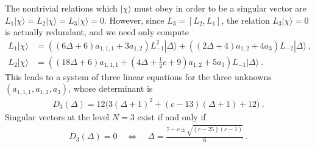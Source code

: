 \documentclass[12pt,a4paper,notitlepage]{report}
\numberwithin{equation}{section}
\theoremstyle{break}
\begin{document}
The nontrivial relations which $|\chi\rangle$ must obey in order to be a singular vector are $L_1|\chi\rangle =L_2|\chi\rangle= L_3 |\chi\rangle=0$. However, since $L_3 = [L_2,L_1]$, the relation $L_3|\chi\rangle=0$ is actually redundant, and we need only compute
\begin{align}
 L_1|\chi\rangle &= \left((6\Delta+6)a_{1,1,1}+3a_{1,2}\right)L_{-1}^2|\Delta\rangle +\left((2\Delta+4)a_{1,2}+4a_3\right)L_{-2}|\Delta\rangle\ ,
\\
L_2|\chi\rangle &= \left((18\Delta+6)a_{1,1,1}+(4\Delta+\tfrac12c +9)a_{1,2}+5a_3\right)L_{-1}|\Delta\rangle\ .
\end{align}
This leads to a system of three linear equations for the three unknowns $(a_{1,1,1},a_{1,2},a_3)$, whose determinant is
\begin{align}
 D_3(\Delta) = 12\Big(3(\Delta+1)^2+(c-13)(\Delta+1)+12\Big)\ .
\end{align}
Singular vectors at the level $N=3$ exist if and only if 
\begin{align}
 D_3(\Delta) = 0 \quad \Leftrightarrow \quad \Delta = \frac{7-c\pm\sqrt{(c-25)(c-1)}}{6}\ .
\end{align}
\end{document}
